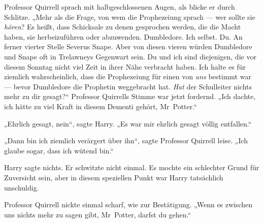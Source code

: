 Professor Quirrell sprach mit halbgeschlossenen Augen, als blicke er durch Schlitze.
„Mehr als die Frage, von wem die Prophezeiung sprach — wer sollte sie \emph{hören}? Es heißt, dass Schicksale zu denen gesprochen werden, die die Macht haben, sie herbeizuführen oder abzuwenden. Dumbledore. Ich selbst. Du. An ferner vierter Stelle Severus Snape. Aber von diesen vieren würden Dumbledore und Snape oft in Trelawneys Gegenwart sein. Du und ich sind diejenigen, die vor diesem Sonntag nicht viel Zeit in ihrer Nähe verbracht haben. Ich halte es für ziemlich wahrscheinlich, dass die Prophezeiung für einen von \emph{uns} bestimmt war — bevor Dumbledore die Prophetin weggebracht hat. \emph{Hat} der Schulleiter nichts mehr zu dir gesagt?“ Professor Quirrells Stimme war jetzt fordernd.
„Ich dachte, ich hätte zu viel Kraft in diesem Dementi gehört, Mr~Potter.“

„Ehrlich gesagt, nein“, sagte Harry.
„Es war mir ehrlich gesagt völlig entfallen.“

„Dann bin ich ziemlich verärgert über ihn“, sagte Professor Quirrell leise.
„Ich glaube sogar, dass ich wütend bin.“

Harry sagte nichts. Er schwitzte nicht einmal. Es mochte ein schlechter Grund für Zuversicht sein, aber in diesem speziellen Punkt war Harry tatsächlich unschuldig.

Professor Quirrell nickte einmal scharf, wie zur Bestätigung.
„Wenn es zwischen uns nichts mehr zu sagen gibt, Mr~Potter, darfst du gehen.“

